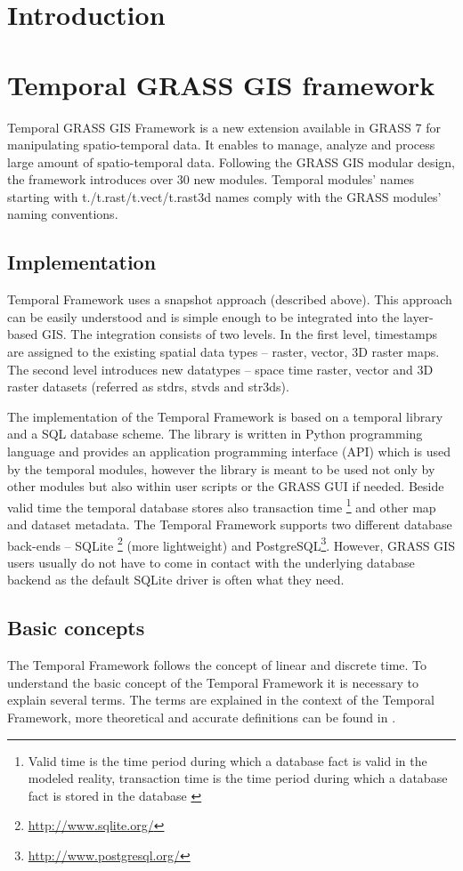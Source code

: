 \documentclass[a4paper,12pt]{book}
\newcommand{\tf}{Temporal Framework\xspace}
\begin{document}
\section{Introduction}
\section{Temporal GRASS GIS framework}
Temporal GRASS GIS Framework is a new extension available in GRASS 7 for manipulating spatio-temporal data.
It enables to manage, analyze and process large amount of spatio-temporal data.
Following the GRASS GIS modular design, the framework introduces over 30 new modules.
Temporal modules' names starting with t./t.rast/t.vect/t.rast3d names
comply with the GRASS modules' naming conventions.

\subsection{Implementation}
\tf uses a snapshot approach (described above).
This approach can be easily understood and is simple enough to be integrated into the layer-based GIS.
The integration consists of two levels.
In the first level, timestamps are assigned to the existing spatial data types -- raster, vector, 3D raster maps.
The second level introduces new datatypes -- space time raster,
vector and 3D raster datasets (referred as stdrs, stvds and str3ds).

The implementation of the \tf is based on a temporal library and a SQL database scheme.
The library is written in Python programming language and provides an application programming interface (API) which is used by the temporal modules,
however the library is meant to be used not only by other modules but also within user scripts or the GRASS GUI if needed.
Beside valid time the temporal database stores also transaction time%
\footnote{Valid time is the time period during which a database fact is valid in the modeled reality,
transaction time  is the time period during which a database fact is stored in the database \cite{temporalGlossary}}
and other map and dataset metadata.
The \tf supports two different database back-ends -- SQLite%
\footnote{\url{http://www.sqlite.org/}} (more lightweight) and
PostgreSQL\footnote{\url{http://www.postgresql.org/}}.
However, GRASS GIS users usually do not have to come in contact with the underlying database backend
as the default SQLite driver is often what they need.

\subsection{Basic concepts}
The \tf follows the concept of linear and discrete time.
To understand the basic concept of the \tf it is necessary to explain several terms.
The terms are explained in the context of the \tf , more theoretical and accurate definitions can be found in \cite{temporalGlossary}.
\end{document}
